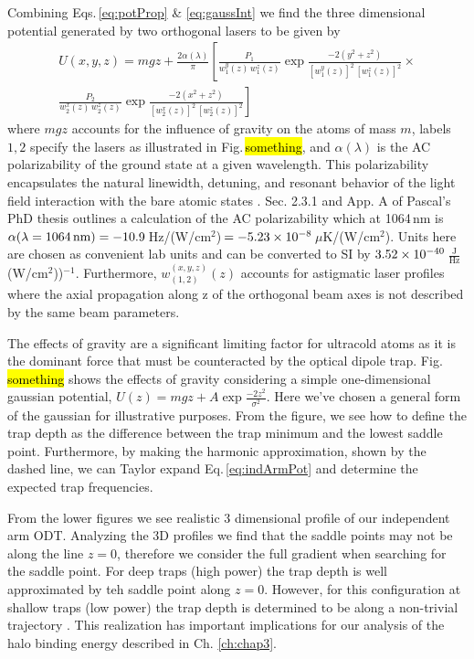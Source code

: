 Combining Eqs.\,\ref{eq:potProp} \& \ref{eq:gaussInt} we find the three dimensional potential generated by two orthogonal lasers to be given by
\begin{equation} \label{eq:indArmPot}
\begin{split}
	U(x,y,z) = m g z + \frac{2\alpha(\lambda)}{\pi} \left[ \frac{P_1}{w_1^y(z)\, w_1^z(z)} \exp{\frac{-2 (y^2+z^2)}{[w_1^y(z)]^2 \,[w_1^z(z)]^2}} \times \right. \\
	\left. \frac{P_2}{w_2^x(z)\, w_2^z(z)} \exp{\frac{-2 (x^2+z^2)}{[w_2^x(z)]^2\,[w_2^z(z)]^2}} \right]
\end{split}
\end{equation}
where $mgz$ accounts for the influence of gravity on the atoms of mass $m$, labels $1,2$ specify the lasers as illustrated in Fig.\,\hl{something}, and $\alpha(\lambda)$ is the AC polarizability of the ground state at a given wavelength.
This polarizability encapsulates the natural linewidth, detuning, and resonant behavior of the light field interaction with the bare atomic states \cite{Grimm1999a}.
Sec. 2.3.1 and App. A of Pascal's PhD thesis \cite{Mickelson2010b} outlines a calculation of the AC polarizability which at 1064\,nm is $\alpha( \lambda = \text{1064\,nm} ) = -10.9$\,Hz/(W/cm$^2$)\,$=-5.23\times 10^{-8}$\,$\mu$K/(W/cm$^2$).
Units here are chosen as convenient lab units and can be converted to SI by $3.52\times 10^{-40}$\,$\frac{\text{J}}{\text{Hz}}$\,(W/cm$^2$))$^{-1}$. 
Furthermore, $w_{(1,2)}^{(x,y,z)}(z)$ accounts for astigmatic laser profiles where the axial propagation along z of the orthogonal beam axes is not described by the same beam parameters.

The effects of gravity are a significant limiting factor for ultracold atoms as it is the dominant force that must be counteracted by the optical dipole trap.
Fig.\,\hl{something} shows the effects of gravity considering a simple one-dimensional gaussian potential, $U(z) = mgz + A\exp{\frac{-2z^2}{\sigma^2}}$.
Here we've chosen a general form of the gaussian for illustrative purposes.
From the figure, we see how to define the trap depth as the difference between the trap minimum and the lowest saddle point.
Furthermore, by making the harmonic approximation, shown by the dashed line, we can Taylor expand Eq.\,\ref{eq:indArmPot} and determine the expected trap frequencies.

From the lower figures we see realistic 3 dimensional profile of our independent arm ODT.
Analyzing the 3D profiles we find that the saddle points may not be along the line $z=0$, therefore we consider the full gradient when searching for the saddle point.
For deep traps (high power) the trap depth is well approximated by teh saddle point along $z=0$.
However, for this configuration at shallow traps (low power) the trap depth is determined to be along a non-trivial trajectory .
This realization has important implications for our analysis of the halo binding energy described in Ch. \ref{ch:chap3}.

